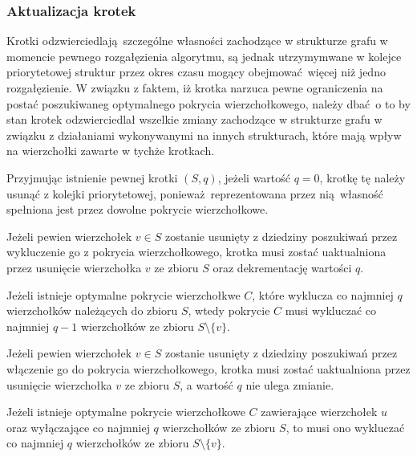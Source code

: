 \subsubsection{\textbf{Aktualizacja krotek}}
\label{sss_ckx_updating_tuples}
\par{
  Krotki odzwierciedlają szczególne własności zachodzące w strukturze grafu w momencie pewnego rozgałęzienia algorytmu, są jednak utrzymymwane w kolejce priorytetowej struktur przez okres czasu mogący obejmować więcej niż jedno rozgałęzienie.
  W związku z faktem, iż krotka narzuca pewne ograniczenia na postać poszukiwaneg optymalnego pokrycia wierzchołkowego, należy dbać o to by stan krotek odzwierciedlał wszelkie zmiany zachodzące w strukturze grafu w związku z działaniami wykonywanymi na innych strukturach, które mają wpływ na wierzchołki zawarte w tychże krotkach.
}
\par{
  Przyjmując istnienie pewnej krotki $(S, q)$, jeżeli wartość $q = 0$, krotkę tę należy usunąć z kolejki priorytetowej, ponieważ reprezentowana przez nią własność spełniona jest przez dowolne pokrycie wierzchołkowe.
  \begin{theorem}
    Jeżeli pewien wierzchołek $v \in S$ zostanie usunięty z dziedziny poszukiwań przez wykluczenie go z pokrycia wierzchołkowego, krotka musi zostać uaktualniona przez usunięcie wierzchołka $v$ ze zbioru $S$ oraz dekrementację wartości $q$.
  \end{theorem}
  \begin{bproof}
    Jeżeli istnieje optymalne pokrycie wierzchołkwe $C$, które wyklucza co najmniej $q$ wierzchołków należących do zbioru $S$, wtedy pokrycie $C$ musi wykluczać co najmniej $q-1$ wierzchołków ze zbioru $S \setminus \{v\}$.
  \end{bproof}
  \begin{theorem}
    Jeżeli pewien wierzchołek $v \in S$ zostanie usunięty z dziedziny poszukiwań przez włączenie go do pokrycia wierzchołkowego, krotka musi zostać uaktualniona przez usunięcie wierzchołka $v$ ze zbioru $S$, a wartość $q$ nie ulega zmianie.
  \end{theorem}
  \begin{bproof}
    Jeżeli istnieje optymalne pokrycie wierzchołkowe $C$ zawierające wierzchołek $u$ oraz wyłączające co najmniej $q$ wierzchołków ze zbioru $S$, to musi ono wykluczać co najmniej $q$ wierzchołków ze zbioru $S \setminus \{v\}$.
  \end{bproof}
}
